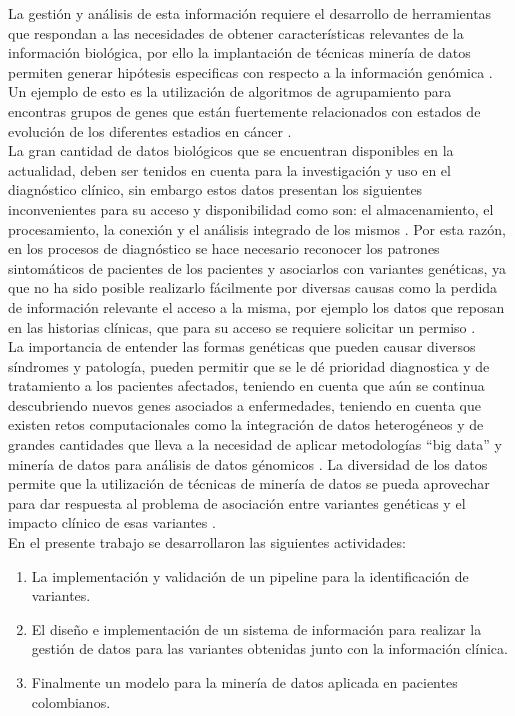 La gestión y análisis de esta información requiere el desarrollo de herramientas que respondan a las necesidades de obtener características relevantes de la información biológica, por ello la implantación de técnicas minería de datos permiten generar hipótesis especificas con respecto a la información genómica \cite{Huttenhower2010}. Un ejemplo de esto es la utilización de algoritmos de agrupamiento para encontras grupos de genes que están fuertemente relacionados con estados de evolución de los diferentes estadios en cáncer \cite{Li2014}.\\

La gran cantidad de datos biológicos que se encuentran disponibles en la actualidad, deben ser tenidos en cuenta para la investigación y  uso en el diagnóstico clínico, sin embargo estos datos presentan los siguientes inconvenientes para su acceso y disponibilidad como son: el almacenamiento, el procesamiento, la conexión y el análisis integrado de los mismos \cite{Pabinger2014}. Por esta razón, en los procesos de diagnóstico se hace necesario reconocer los patrones  sintomáticos de pacientes de los pacientes y asociarlos con variantes genéticas, ya que no ha sido posible realizarlo fácilmente por diversas causas como la perdida de información relevante el acceso a la misma, por ejemplo los datos que reposan en las historias clínicas, que para su acceso se requiere solicitar un permiso \cite{Pabinger2014}. \\

La importancia de entender las formas genéticas que pueden causar diversos síndromes y patología, pueden permitir que se le dé prioridad diagnostica y de tratamiento a los pacientes afectados, teniendo en cuenta que aún se continua descubriendo nuevos genes asociados a enfermedades, teniendo en cuenta que existen retos computacionales como la integración de datos heterogéneos y de grandes cantidades que lleva a la necesidad de aplicar metodologías “big data” y minería de datos para análisis de datos génomicos \cite{Maharjan2011,Hannah-Shmouni2015,Louie2007}. La diversidad de los datos permite que la utilización de técnicas de minería de datos se pueda aprovechar para dar respuesta al problema de asociación entre variantes genéticas y el impacto clínico de esas variantes \cite{Pabinger2014}.
\\

En el presente trabajo se desarrollaron las siguientes actividades:

\begin{enumerate}  
	\item La implementación y validación de un pipeline para la identificación de variantes.
	\item El diseño e implementación de un sistema de información para realizar la gestión de datos para las variantes obtenidas junto con la información clínica.
	\item Finalmente un modelo para la  minería de datos aplicada en pacientes colombianos.
\end{enumerate}
 
